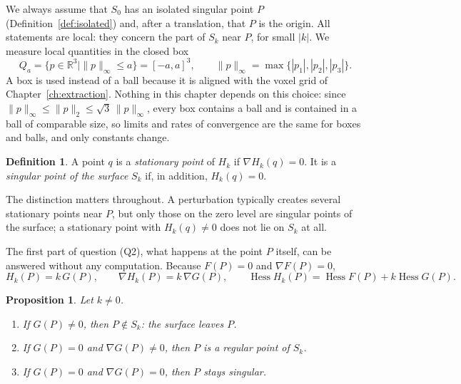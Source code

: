 \documentclass[12pt, a4paper, oneside]{book}
\theoremstyle{plain}
\newtheorem{proposition}[theorem]{Proposition}
\theoremstyle{definition}
\newtheorem{definition}[theorem]{Definition}
\theoremstyle{remark}
\theoremstyle{definition}
\begin{document}
We always assume that $S_0$ has an isolated singular point $P$ (Definition~\ref{def:isolated}) and, after a translation, that $P$ is the origin. All statements are local: they concern the part of $S_k$ near $P$, for small $|k|$. We measure local quantities in the closed box
\begin{equation}
\label{eq:box}
Q_a=\{p\in\mathbb{R}^3 \mid \|p\|_\infty\le a\}=[-a,a]^3,\qquad
\|p\|_\infty=\max\{|p_1|,|p_2|,|p_3|\}.
\end{equation}
A box is used instead of a ball because it is aligned with the voxel grid of Chapter~\ref{ch:extraction}. Nothing in this chapter depends on this choice: since $\|p\|_\infty\le\|p\|_2\le\sqrt3\,\|p\|_\infty$, every box contains a ball and is contained in a ball of comparable size, so limits and rates of convergence are the same for boxes and balls, and only constants change.

\begin{definition}
\label{def:stationary}
A point $q$ is a \emph{stationary point} of $H_k$ if $\nabla H_k(q)=0$. It is a \emph{singular point of the surface} $S_k$ if, in addition, $H_k(q)=0$.
\end{definition}

The distinction matters throughout. A perturbation typically creates several stationary points near $P$, but only those on the zero level are singular points of the surface; a stationary point with $H_k(q)\neq0$ does not lie on $S_k$ at all.

The first part of question (Q2), what happens at the point $P$ itself, can be answered without any computation. Because $F(P)=0$ and $\nabla F(P)=0$,
\begin{equation}
\label{eq:at-origin}
H_k(P)=k\,G(P),\qquad \nabla H_k(P)=k\,\nabla G(P),\qquad
\operatorname{Hess}H_k(P)=\operatorname{Hess}F(P)+k\operatorname{Hess}G(P).
\end{equation}

\begin{proposition}
\label{prop:fate}
Let $k\neq0$.
\begin{enumerate}
    \item If $G(P)\neq0$, then $P\notin S_k$: the surface \emph{leaves} $P$.
    \item If $G(P)=0$ and $\nabla G(P)\neq0$, then $P$ is a \emph{regular} point of $S_k$.
    \item If $G(P)=0$ and $\nabla G(P)=0$, then $P$ \emph{stays singular}.
\end{enumerate}
\end{proposition}
\end{document}
